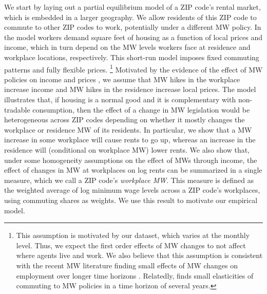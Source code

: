 We start by laying out a partial equilibrium model of a ZIP code's rental market,
which is embedded in a larger geography.
We allow residents of this ZIP code to commute to other ZIP codes to work, 
potentially under a different MW policy.
In the model workers demand square feet of housing as a function of local prices 
and income, which in turn depend on the MW levels workers face at residence and 
workplace locations, respectively.
This short-run model imposes fixed commuting patterns and fully flexible prices.%
\footnote{This assumption is motivated by our dataset, which varies at the monthly
level. Thus, we expect the first order effects of MW changes to not affect where
agents live and work.
We also believe that this assumption is consistent with the recent MW literature
finding small effects of MW changes on employment over longer time horizons
\parencite[see][for a review]{Dube2019}.
Relatedly, \textcite{PerezPerez2021} finds small elasticities of commuting to MW 
policies in a time horizon of several years.}
Motivated by the evidence of the effect of MW policies on 
income \parencite{Dube2019Income, CegnizEtAl2019} and 
prices \parencite{AllegrettoReich2018, Leung2021}, 
we assume that MW hikes in the workplace increase income and 
MW hikes in the residence increase local prices.
The model illustrates that, 
if housing is a normal good and it is complementary with non-tradable consumption, 
then the effect of a change in MW legislation would be heterogeneous across ZIP 
codes depending on whether it mostly changes the workplace or residence MW of 
its residents.
In particular, we show that a MW increase in some workplace will cause rents to 
go up, whereas an increase in the residence will (conditional on workplace MW) 
lower rents.
We also show that, under some homogeneity assumptions on the effect of MWs 
through income, the effect of changes in MW at workplaces on log rents can be 
summarized in a single measure, which we call a ZIP code's \textit{workplace MW}.
This measure is defined as the weighted average of log minimum wage levels 
across a ZIP code's workplaces, using commuting shares as weights.
We use this result to motivate our empirical model.


